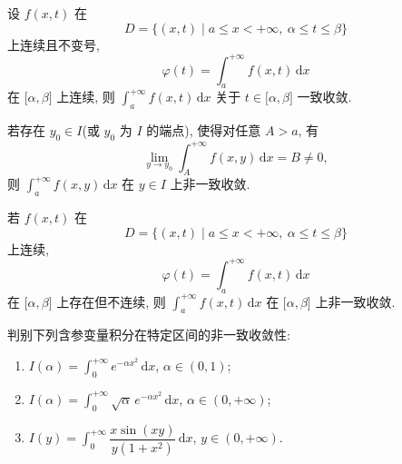 \begin{theorem}
    设 $f(x,t)$ 在
    \[
        D=\{(x,t)\mid a\leq x<+\infty,\ \alpha\leq t\leq\beta\}
    \]
    上连续且不变号,
    \[
        \varphi(t)=\int_a^{+\infty}f(x,t)\,\mathrm{d}x
    \]
    在 $\lbrack\alpha,\beta\rbrack$ 上连续, 则 $\displaystyle\int_a^{+\infty}f(x,t)\,\mathrm{d}x$ 关于 $t\in\lbrack\alpha,\beta\rbrack$ 一致收敛.
\end{theorem}

\begin{proposition}
    若存在 $y_0\in I$(或 $y_0$ 为 $I$ 的端点), 使得对任意 $A>a$, 有
    \[
        \lim\limits_{y\to y_0}\int_A^{+\infty}f(x,y)\,\mathrm{d}x=B\ne0,
    \]
    则 $\displaystyle\int_a^{+\infty}f(x,y)\,\mathrm{d}x$ 在 $y\in I$ 上非一致收敛.
\end{proposition}

\begin{theorem}[\markstar]
    若 $f(x,t)$ 在
    \[
        D=\{(x,t)\mid a\leq x<+\infty,\ \alpha\leq t\leq\beta\}
    \]
    上连续,
    \[
        \varphi(t)=\int_a^{+\infty}f(x,t)\,\mathrm{d}x
    \]
    在 $\lbrack\alpha,\beta\rbrack$ 上存在但不连续, 则 $\displaystyle\int_a^{+\infty}f(x,t)\,\mathrm{d}x$ 在 $\lbrack\alpha,\beta\rbrack$ 上非一致收敛.
\end{theorem}

\begin{example}
    判别下列含参变量积分在特定区间的非一致收敛性:
    \begin{enumerate}
        \item $\displaystyle I(\alpha)=\int_0^{+\infty}e^{-\alpha x^2}\,\mathrm{d}x$, $\alpha\in(0,1)$;
        \item $\displaystyle I(\alpha)=\int_0^{+\infty}\sqrt{\alpha}\,e^{-\alpha x^2}\,\mathrm{d}x$, $\alpha\in(0,+\infty)$;
        \item $\displaystyle I(y)=\int_0^{+\infty}\dfrac{x\sin(xy)}{y(1+x^2)}\,\mathrm{d}x$, $y\in(0,+\infty)$.
    \end{enumerate}
\end{example}
\exampleblank

